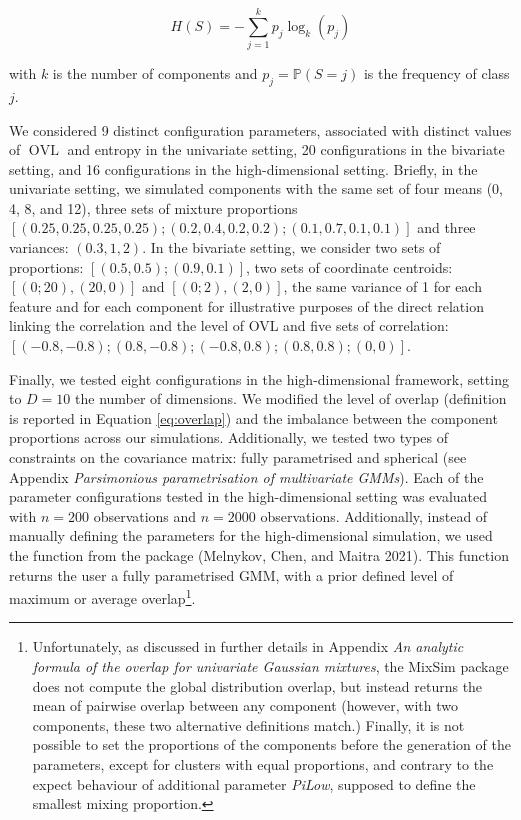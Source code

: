 \begin{equation}
    H(S)=-\sum_{j=1}^k p_j \log_k (p_j)
\label{eq:entropy}
\end{equation}

with \(k\) is the number of components and \(p_j=\mathbb{P}(S=j)\) is the frequency of class \(j\).

We considered 9 distinct configuration parameters, associated with distinct values of \(\operatorname{OVL}\) and entropy in the univariate setting, 20 configurations in the bivariate setting, and 16 configurations in the high-dimensional setting. Briefly, in the univariate setting, we simulated components with the same set of four means (0, 4, 8, and 12), three sets of mixture proportions\\
\(\left[(0.25, 0.25, 0.25, 0.25); (0.2, 0.4, 0.2, 0.2); (0.1, 0.7, 0.1, 0.1) \right]\) and three variances: \((0.3, 1, 2)\). In the bivariate setting, we consider two sets of proportions: \(\left[(0.5, 0.5); (0.9, 0.1) \right]\), two sets of coordinate centroids: \(\left[(0; 20), (20, 0) \right]\) and \(\left[(0; 2), (2, 0) \right]\), the same variance of 1 for each feature and for each component for illustrative purposes of the direct relation linking the correlation and the level of OVL and five sets of correlation:\([(-0.8, -0.8); (0.8, -0.8); (-0.8, 0.8); (0.8, 0.8); (0, 0)]\).

Finally, we tested eight configurations in the high-dimensional framework, setting to \(D=10\) the number of dimensions. We modified the level of overlap (definition is reported in Equation \eqref{eq:overlap}) and the imbalance between the component proportions across our simulations. Additionally, we tested two types of constraints on the covariance matrix: fully parametrised and spherical (see Appendix \emph{Parsimonious parametrisation of multivariate GMMs}). Each of the parameter configurations tested in the high-dimensional setting was evaluated with \(n=200\) observations and \(n=2000\) observations. Additionally, instead of manually defining the parameters for the high-dimensional simulation, we used the  function from the  package (Melnykov, Chen, and Maitra 2021). This function returns the user a fully parametrised GMM, with a prior defined level of maximum or average overlap\footnote{Unfortunately, as discussed in further details in Appendix \emph{An analytic formula of the overlap for univariate Gaussian mixtures}, the MixSim package does not compute the global distribution overlap, but instead returns the mean of pairwise overlap between any component (however, with two components, these two alternative definitions match.) Finally, it is not possible to set the proportions of the components before the generation of the parameters, except for clusters with equal proportions, and contrary to the expect behaviour of additional parameter \emph{PiLow}, supposed to define the smallest mixing proportion.}.

